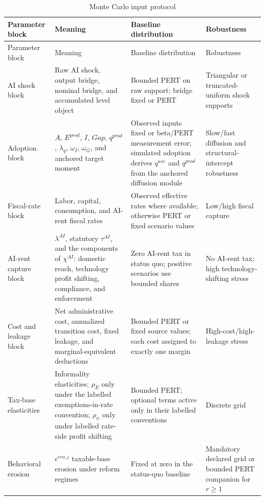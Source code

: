 \documentclass[11pt,a4paper]{article}
\begin{document}
\begin{footnotesize}
\begin{longtable}{>{\raggedright\arraybackslash}p{}>{\raggedright\arraybackslash}p{}>{\raggedright\arraybackslash}p{}>{\raggedright\arraybackslash}p{}}
\caption{Monte Carlo input protocol}\label{tab:mc_inputs}\\
\toprule
Parameter block & Meaning & Baseline distribution & Robustness \\
\midrule
\endfirsthead
\toprule
Parameter block & Meaning & Baseline distribution & Robustness \\
\midrule
\endhead
AI shock block & Raw AI shock, output bridge, nominal bridge, and accumulated level object & Bounded PERT on raw support; bridge fixed or PERT & Triangular or truncated-uniform shock supports \\
Adoption block & $A$, $E^{prod}$, $I$, $Gap$, $q^{prod}$, $\lambda_q$, $\omega_I$, $\omega_G$, and anchored target moment & Observed inputs fixed or beta/PERT measurement error; simulated adoption derives $q^{use}$ and $q^{prod}$ from the anchored diffusion module & Slow/fast diffusion and structural-intercept robustness \\
Fiscal-rate block & Labor, capital, consumption, and AI-rent fiscal rates & Observed effective rates where available; otherwise PERT or fixed scenario values & Low/high fiscal capture \\
AI-rent capture block & $\lambda^{AI}$, statutory $\tau^{AI}$, and the components of $\chi^{AI}$: domestic reach, technology profit shifting, compliance, and enforcement & Zero AI-rent tax in status quo; positive scenarios use bounded shares & No AI-rent tax; high technology-shifting stress \\
Cost and leakage block & Net administrative cost, annualized transition cost, fixed leakage, and marginal-equivalent deductions & Bounded PERT or fixed source values; each cost assigned to exactly one margin & High-cost/high-leakage stress \\
Tax-base elasticities & Informality elasticities; $\rho_E$ only under the labelled exemptions-in-rate convention; $\rho_\psi$ only under labelled rate-side profit shifting & Bounded PERT; optional terms active only in their labelled conventions & Discrete grid \\
Behavioral erosion & $\epsilon^{ero,j}$ taxable-base erosion under reform regimes & Fixed at zero in the status-quo baseline & Mandatory declared grid or bounded PERT companion for $r\geq1$ \\

\end{longtable}
\end{footnotesize}
\end{document}
